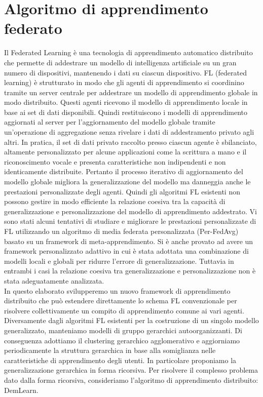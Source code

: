 \chapter{Algoritmo di apprendimento federato}\label{ch:chapter1}
Il Federated Learning è una tecnologia di apprendimento automatico distribuito che permette di addestrare un modello di intelligenza artificiale su un gran numero di dispositivi, mantenendo i dati su ciascun dispositivo.
FL (federated learning) è strutturato in modo che gli agenti di apprendimento si coordinino tramite un server centrale per addestrare un modello di apprendimento globale in modo distribuito. Questi agenti ricevono il modello di apprendimento locale in base ai set di dati disponibili. Quindi restituiscono i modelli di apprendimento aggiornati al server per l'aggiornamento del modello globale tramite un'operazione di aggregazione senza rivelare i dati di addestramento privato agli altri. In pratica, il set di dati privato raccolto presso ciascun agente è sbilanciato, altamente personalizzato per alcune applicazioni come la scrittura a mano e il riconoscimento vocale e presenta caratteristiche non indipendenti e non identicamente distribuite. Pertanto il processo iterativo di aggiornamento del modello globale migliora la generalizzazione del modello ma danneggia anche le prestazioni personalizzate degli agenti. Quindi gli algoritmi FL esistenti non possono gestire in modo efficiente la relazione coesiva tra la capacità di generalizzazione e personalizzazione del modello di apprendimento addestrato. Vi sono stati alcuni tentativi di studiare e migliorare le prestazioni personalizzate di FL utilizzando un algoritmo di media federata personalizzata (Per-FedAvg) basato su un framework di meta-apprendimento. Si è anche provato ad avere un framework personalizzato adattivo in cui è stata adottata una combinazione di modelli locali e globali per ridurre l'errore di generalizzazione. Tuttavia in entrambi i casi la relazione coesiva tra generalizzazione e personalizzazione non è stata adeguatamente analizzata.\\
In questo elaborato svilupperemo un nuovo framework di apprendimento distribuito che può estendere direttamente lo schema FL convenzionale per risolvere collettivamente un compito di apprendimento comune ai vari agenti. Diversamente dagli algoritmi FL esistenti per la costruzione di un singolo modello generalizzato, manteniamo modelli di gruppo gerarchici autoorganizzanti. Di conseguenza adottiamo il clustering gerarchico agglomerativo e aggiorniamo periodicamente la struttura gerarchica in base alla somiglianza nelle caratteristiche di apprendimento degli utenti. In particolare proponiamo la generalizzazione gerarchica in forma ricorsiva. Per risolvere il complesso problema dato dalla forma ricorsiva, consideriamo  l'algoritmo di apprendimento distribuito: DemLearn. 